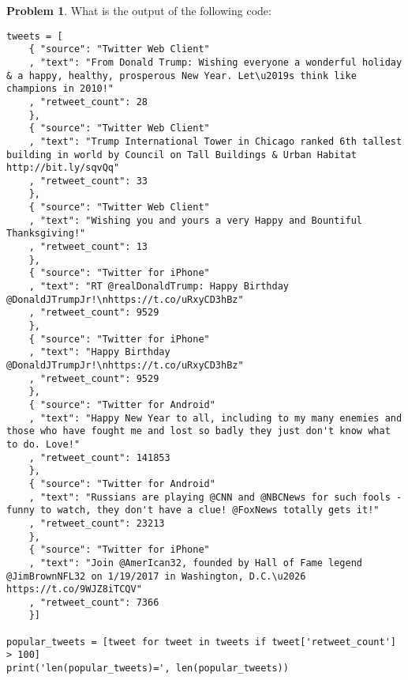 \documentclass[10pt]{article}
\theoremstyle{definition}
\newtheorem{problem}{Problem}
\begin{document}
\begin{problem}
    What is the output of the following code:
\end{problem}
\begin{lstlisting}
tweets = [
    { "source": "Twitter Web Client"
    , "text": "From Donald Trump: Wishing everyone a wonderful holiday & a happy, healthy, prosperous New Year. Let\u2019s think like champions in 2010!"
    , "retweet_count": 28
    }, 
    { "source": "Twitter Web Client"
    , "text": "Trump International Tower in Chicago ranked 6th tallest building in world by Council on Tall Buildings & Urban Habitat http://bit.ly/sqvQq"
    , "retweet_count": 33
    },
    { "source": "Twitter Web Client"
    , "text": "Wishing you and yours a very Happy and Bountiful Thanksgiving!"
    , "retweet_count": 13
    },
    { "source": "Twitter for iPhone"
    , "text": "RT @realDonaldTrump: Happy Birthday @DonaldJTrumpJr!\nhttps://t.co/uRxyCD3hBz"
    , "retweet_count": 9529
    },
    { "source": "Twitter for iPhone"
    , "text": "Happy Birthday @DonaldJTrumpJr!\nhttps://t.co/uRxyCD3hBz"
    , "retweet_count": 9529
    },
    { "source": "Twitter for Android"
    , "text": "Happy New Year to all, including to my many enemies and those who have fought me and lost so badly they just don't know what to do. Love!"
    , "retweet_count": 141853
    },
    { "source": "Twitter for Android"
    , "text": "Russians are playing @CNN and @NBCNews for such fools - funny to watch, they don't have a clue! @FoxNews totally gets it!"
    , "retweet_count": 23213
    },
    { "source": "Twitter for iPhone"
    , "text": "Join @AmerIcan32, founded by Hall of Fame legend @JimBrownNFL32 on 1/19/2017 in Washington, D.C.\u2026 https://t.co/9WJZ8iTCQV"
    , "retweet_count": 7366
    }]

popular_tweets = [tweet for tweet in tweets if tweet['retweet_count'] > 100]
print('len(popular_tweets)=', len(popular_tweets))
\end{lstlisting}
\vspace{1.5in}
\end{document}
